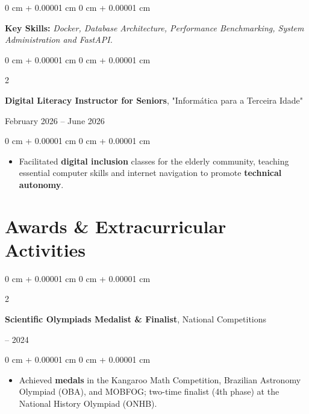 \documentclass[10pt, letterpaper]{article}
\newenvironment{highlights}{
    \begin{itemize}[
        topsep=0.10 cm,
        parsep=0.10 cm,
        partopsep=0pt,
        itemsep=0pt,
        leftmargin=0 cm + 10pt
    ]
}{
    \end{itemize}
} %
\newenvironment{onecolentry}{
    \begin{adjustwidth}{
        0 cm + 0.00001 cm
    }{
        0 cm + 0.00001 cm
    }
}{
    \end{adjustwidth}
} %
\newenvironment{twocolentry}[2][]{
    \onecolentry
    \def\secondColumn{#2}
    \setcolumnwidth{\fill, 4.5 cm}
    \begin{paracol}{2}
}{
    \switchcolumn \raggedleft \secondColumn
    \end{paracol}
    \endonecolentry
} %
\begin{document}
\vspace{0.15 cm}
\begin{onecolentry}
    \setlength{\leftskip}{0.3cm}
    {\footnotesize \textbf{Key Skills:} \textit{Docker, Database Architecture, Performance Benchmarking, System Administration and FastAPI.}}
\end{onecolentry}

\vspace{0.20 cm}
\begin{twocolentry}{
    February 2026 – June 2026
}
    \textbf{Digital Literacy Instructor for Seniors}, "Informática para a Terceira Idade"
\end{twocolentry}

\vspace{0.10 cm}
\begin{onecolentry}
    \begin{highlights}
        \setlength{\rightskip}{1.0cm}
        \setlength{\leftskip}{0.3cm}
        \item Facilitated \textbf{digital inclusion} classes for the elderly community, teaching essential computer skills and internet navigation to promote \textbf{technical autonomy}.
    \end{highlights}
\end{onecolentry}

\vspace{0.15 cm}

\section{Awards \& Extracurricular Activities}

\begin{twocolentry}{
    2021 – 2024
}
    \textbf{Scientific Olympiads Medalist \& Finalist}, National Competitions
\end{twocolentry}

\vspace{0.10 cm}
\begin{onecolentry}
    \begin{highlights}
        \setlength{\rightskip}{1.0cm}
        \setlength{\leftskip}{0.3cm}
        \item Achieved \textbf{medals} in the Kangaroo Math Competition, Brazilian Astronomy Olympiad (OBA), and MOBFOG; two-time finalist (4th phase) at the National History Olympiad (ONHB).
    \end{highlights}
\end{onecolentry}
\end{document}
